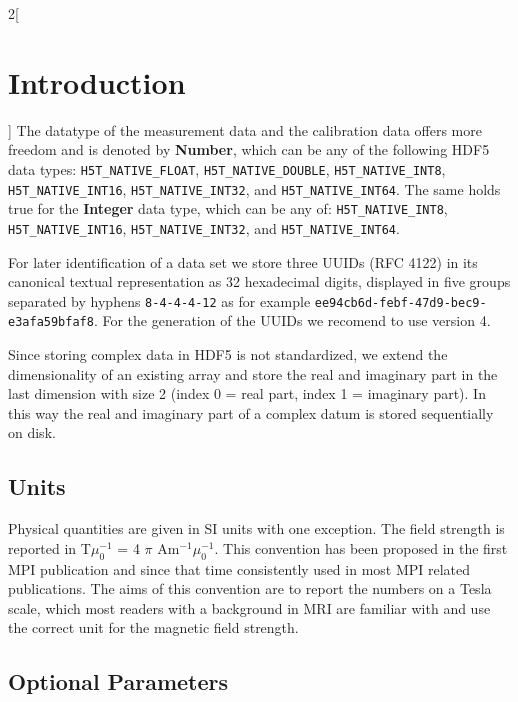 \documentclass[landscape,a4paper]{article} %
\newcommand{\inl}[1]{\lstinline[columns=fixed]{#1}}
\newcommand{\inltab}[1]{{\ttfamily\bfseries\color{blue}#1}}
\begin{document}
\begin{multicols}{2}[\section{Introduction} \label{Sec:Introduction}]
The datatype of the measurement data and the calibration data offers more freedom and is denoted by \inltab{Number}, which can be any of the following HDF5 data types: \inl{H5T_NATIVE_FLOAT}, \inl{H5T_NATIVE_DOUBLE}, \inl{H5T_NATIVE_INT8}, \inl{H5T_NATIVE_INT16}, \inl{H5T_NATIVE_INT32}, and \inl{H5T_NATIVE_INT64}. The same holds true for the \inltab{Integer} data type, which can be any of: \inl{H5T_NATIVE_INT8}, \inl{H5T_NATIVE_INT16}, \inl{H5T_NATIVE_INT32}, and \inl{H5T_NATIVE_INT64}. 

For later identification of a data set we store three UUIDs (RFC 4122) \cite{leach2005universally} in its canonical textual representation as 32 hexadecimal digits, displayed in five groups separated by hyphens \inl{8-4-4-4-12} as for example \inl{ee94cb6d-febf-47d9-bec9-e3afa59bfaf8}. For the generation of the UUIDs we recomend to use version 4.

Since storing complex data in HDF5 is not standardized, we extend the dimensionality of an existing array and store the real and imaginary part in the last dimension with size 2 (index 0 = real part, index 1 = imaginary part). In this way the real and imaginary part of a complex datum is stored sequentially on disk.

\subsection{Units}

Physical quantities are given in SI units with one exception. The field strength is reported in T$\mu_0^{-1}$ = 4 $\pi$ Am$^{-1}\mu_0^{-1}$. This convention has been proposed in the first MPI publication \cite{Gleich2005} and since that time consistently used in most MPI related publications. The aims of this convention are to report the numbers on a Tesla scale, which most readers with a background in MRI are familiar with and use the correct unit for the magnetic field strength.

\subsection{Optional Parameters}


\end{multicols}
\end{document}
